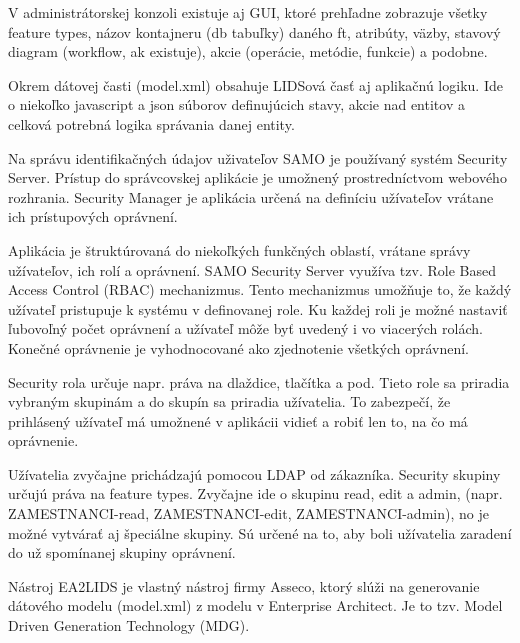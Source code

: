 V administrátorskej konzoli existuje aj GUI, ktoré prehľadne zobrazuje všetky feature types, názov kontajneru (db tabuľky) daného ft, atribúty, väzby, stavový diagram (workflow, ak existuje), akcie (operácie, metódie, funkcie) a podobne. 

Okrem dátovej časti (model.xml) obsahuje LIDSová časť aj aplikačnú logiku. Ide o niekoľko javascript a json súborov definujúcich stavy, akcie nad entitov a celková potrebná logika správania danej entity.


Na správu identifikačných údajov uživateľov SAMO je používaný systém Security Server. Prístup do správcovskej aplikácie je umožnený prostredníctvom webového rozhrania. Security Manager je aplikácia určená na definíciu užívateľov vrátane ich prístupových oprávnení. 

Aplikácia je štruktúrovaná do niekoľkých funkčných oblastí, vrátane správy užívateľov, ich rolí a oprávnení. SAMO Security Server využíva tzv. Role Based Access Control (RBAC) mechanizmus. Tento mechanizmus umožňuje to, že každý užívateľ pristupuje k systému v definovanej role. Ku každej roli je možné nastaviť ľubovoľný počet oprávnení a užívateľ môže byť uvedený i vo viacerých rolách. Konečné oprávnenie je vyhodnocované ako zjednotenie všetkých oprávnení.

Security rola určuje napr. práva na dlaždice, tlačítka a pod. Tieto role sa priradia vybraným skupinám a do skupín sa priradia užívatelia. To zabezpečí, že prihlásený užívateľ má umožnené v aplikácii vidieť a robiť len to, na čo má oprávnenie.

Užívatelia zvyčajne prichádzajú pomocou LDAP od zákazníka. Security skupiny určujú práva na feature types. Zvyčajne ide o skupinu read, edit a admin, (napr. ZAMESTNANCI-read, ZAMESTNANCI-edit, ZAMESTNANCI-admin), no je možné vytvárať aj špeciálne skupiny. Sú určené na to, aby boli užívatelia zaradení do už spomínanej skupiny oprávnení.


Nástroj EA2LIDS je vlastný nástroj firmy Asseco, ktorý slúži na generovanie dátového modelu (model.xml) z modelu v Enterprise Architect. Je to tzv. Model Driven Generation Technology (MDG). 

